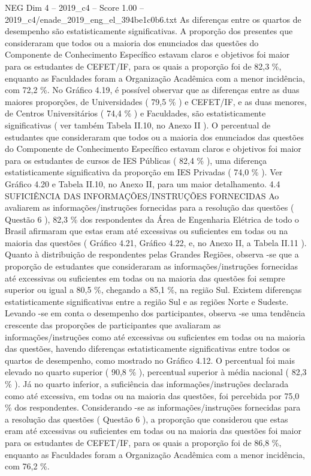 \begin{textsample}{NEG Dim 4 – 2019\_c4 – Score 1.00 – 2019\_c4/enade\_2019\_eng\_el\_394be1c0b6.txt}
As diferenças entre os quartos de desempenho são estatisticamente significativas.
A proporção dos presentes que consideraram que todos ou a maioria dos enunciados das questões do Componente de Conhecimento Específico estavam claros e objetivos foi maior para os estudantes de CEFET/IF, para os quais a proporção foi de 82,3 \%, enquanto as Faculdades foram a Organização Acadêmica com a menor incidência, com 72,2 \%.
No Gráfico 4.19, é possível observar que as diferenças entre as duas maiores proporções, de Universidades ( 79,5 \% ) e CEFET/IF, e as duas menores, de Centros Universitários ( 74,4 \% ) e Faculdades, são estatisticamente significativas ( ver também Tabela II.10, no Anexo II ).
O percentual de estudantes que consideraram que todos ou a maioria dos enunciados das questões do Componente de Conhecimento Específico estavam claros e objetivos foi maior para os estudantes de cursos de IES Públicas ( 82,4 \% ), uma diferença estatisticamente significativa da proporção em IES Privadas ( 74,0 \% ).
Ver Gráfico 4.20 e Tabela II.10, no Anexo II, para um maior detalhamento. 4.4 SUFICIÊNCIA DAS INFORMAÇÕES/INSTRUÇÕES FORNECIDAS Ao avaliarem as informações/instruções fornecidas para a resolução das questões ( Questão 6 ), 82,3 \% dos respondentes da Área de Engenharia Elétrica de todo o Brasil afirmaram que estas eram até excessivas ou suficientes em todas ou na maioria das questões ( Gráfico 4.21, Gráfico 4.22, e, no Anexo II, a Tabela II.11 ).
Quanto à distribuição de respondentes pelas Grandes Regiões, observa -se que a proporção de estudantes que consideraram as informações/instruções fornecidas até excessivas ou suficientes em todas ou na maioria das questões foi sempre superior ou igual a 80,5 \%, chegando a 85,1 \%, na região Sul.
Existem diferenças estatisticamente significativas entre a região Sul e as regiões Norte e Sudeste.
Levando -se em conta o desempenho dos participantes, observa -se uma tendência crescente das proporções de participantes que avaliaram as informações/instruções como até excessivas ou suficientes em todas ou na maioria das questões, havendo diferenças estatisticamente significativas entre todos os quartos de desempenho, como mostrado no Gráfico 4.12.
O percentual foi mais elevado no quarto superior ( 90,8 \% ), percentual superior à média nacional ( 82,3 \% ).
Já no quarto inferior, a suficiência das informações/instruções declarada como até excessiva, em todas ou na maioria das questões, foi percebida por 75,0 \% dos respondentes.
Considerando -se as informações/instruções fornecidas para a resolução das questões ( Questão 6 ), a proporção que considerou que estas eram até excessivas ou suficientes em todas ou na maioria das questões foi maior para os estudantes de CEFET/IF, para os quais a proporção foi de 86,8 \%, enquanto as Faculdades foram a Organização Acadêmica com a menor incidência, com 76,2 \%.

\end{textsample}
